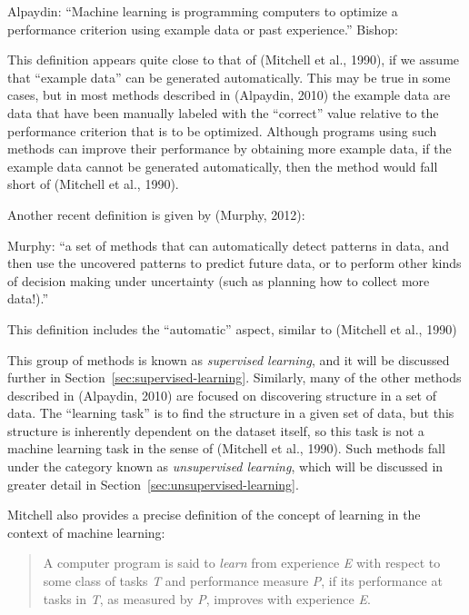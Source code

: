 Alpaydin: ``Machine learning is programming computers to optimize a performance criterion using example data or past experience.''
Bishop: 


This definition appears quite close to that of (Mitchell et al., 1990), if we assume that ``example data'' can be generated automatically. This may be true in some cases, but in most methods described in (Alpaydin, 2010) the example data are data that have been manually labeled with the ``correct'' value relative to the performance criterion that is to be optimized. Although programs using such methods can improve their performance by obtaining more example data, if the example data cannot be generated automatically, then the method would fall short of (Mitchell et al., 1990).

Another recent definition is given by (Murphy, 2012):

Murphy: ``a set of methods that can automatically detect patterns in data, and then use the uncovered patterns to predict future data, or to perform other kinds of decision making under uncertainty (such as planning how to collect more data!).''

This definition includes the ``automatic'' aspect, similar to (Mitchell et al., 1990)

This group of methods is known as \emph{supervised learning}, and it will be discussed further in Section~\ref{sec:supervised-learning}. Similarly, many of the other methods described in (Alpaydin, 2010) are focused on discovering structure in a set of data. The ``learning task'' is to find the structure in a given set of data, but this structure is inherently dependent on the dataset itself, so this task is not a machine learning task in the sense of (Mitchell et al., 1990). Such methods fall under the category known as \emph{unsupervised learning}, which will be discussed in greater detail in Section~\ref{sec:unsupervised-learning}.

Mitchell also provides a precise definition of the concept of learning in the context of machine learning:
%
\begin{quote}
A computer program is said to \emph{learn} from experience \emph{E} with respect to some class of tasks \emph{T} and performance measure \emph{P}, if its performance at tasks in \emph{T}, as measured by \emph{P}, improves with experience \emph{E}.
\end{quote}
%
%
%


